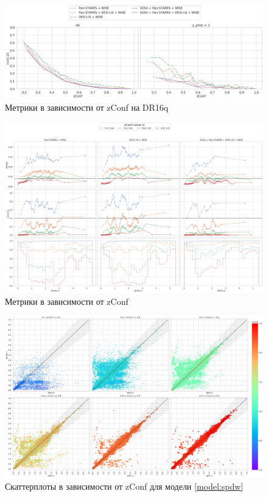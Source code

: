 \documentclass[fleqn,usenatbib]{mnras}
\begin{document}
\begin{figure}
    \centering
    \includegraphics[width=0.99\linewidth]{images/metrics-by-zconf-dr16q.png}
    \caption{Метрики в зависимости от zConf на DR16q}
    \label{fig:metrics-zconf-cv2}
\end{figure}

\begin{figure}
    \centering
    \includegraphics[width=0.99\linewidth]{images/metrics-zconf-cv2.png}
    \caption{Метрики в зависимости от zConf}
    \label{fig:metrics-zconf-cv2}
\end{figure}

\begin{figure}
    \centering
    \includegraphics[width=0.99\linewidth]{images/zconf-scatterplot-35.png}
    \caption{Скаттерплоты в зависимости от zConf для модели \ref{model:spdw}}
    \label{fig:zconf-scatterplot-35}
\end{figure}
\end{document}
